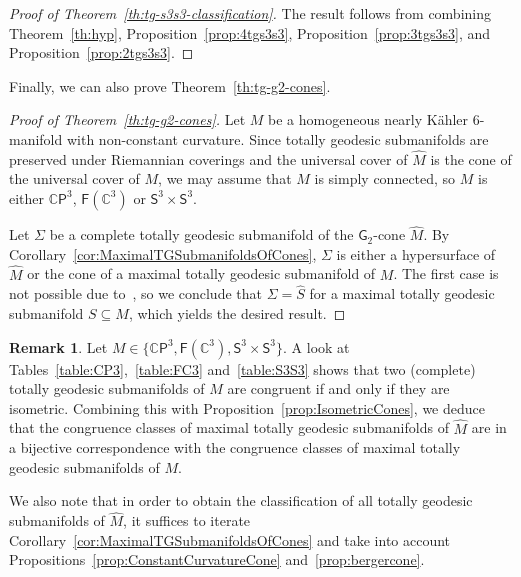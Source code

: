 \documentclass[11pt,a4paper,final]{amsart}
\newcommand{\s}{\mathsf}
\newcommand{\C}{\mathbb{C}}
\renewcommand{\hat}{\widehat}
\theoremstyle{definition}
\newtheorem{remark}[theorem]{Remark}
\begin{document}
\begin{proof}[Proof of Theorem~\ref{th:tg-s3s3-classification}]
	The result follows from combining Theorem~\ref{th:hyp}, Proposition~\ref{prop:4tgs3s3}, Proposition~\ref{prop:3tgs3s3}, and Proposition~\ref{prop:2tgs3s3}. 
\end{proof}

Finally, we can also prove Theorem~\ref{th:tg-g2-cones}.
\begin{proof}[Proof of Theorem~\ref{th:tg-g2-cones}]
	Let $M$ be a homogeneous nearly Kähler $6$-manifold with non-constant curvature.
	Since totally geodesic submanifolds are preserved under Riemannian coverings and the universal cover of $\hat{M}$ is the cone of the universal cover of $M$, we may assume that $M$ is simply connected, so $M$ is either $\C\s{P}^3$, $\s{F}(\C^3)$ or $\s{S}^3\times\s{S}^3$.
	
	Let $\Sigma$ be a complete totally geodesic submanifold of the $\s{G}_2$-cone $\hat{M}$.
	By Corollary~\ref{cor:MaximalTGSubmanifoldsOfCones}, $\Sigma$ is either a hypersurface of $\hat{M}$ or the cone of a maximal totally geodesic submanifold of $M$.
	The first case is not possible due to~\cite[Theorem~1.2]{JentschMoroianuSemmelmann}, so we conclude that $\Sigma=\hat{S}$ for a maximal totally geodesic submanifold $S\subseteq M$, which yields the desired result.
\end{proof}
\begin{remark}
	Let $M\in\{\C\s{P}^3,\s{F}(\C^3),\s{S}^3\times\s{S}^3 \}$.
	A look at Tables~\ref{table:CP3},~\ref{table:FC3} and~\ref{table:S3S3} shows that two (complete) totally geodesic submanifolds of $M$ are congruent if and only if they are isometric.
	Combining this with Proposition~\ref{prop:IsometricCones}, we deduce that the congruence classes of maximal totally geodesic submanifolds of $\hat{M}$ are in a bijective correspondence with the congruence classes of maximal totally geodesic submanifolds of $M$.

	We also note that in order to obtain the classification of all totally geodesic submanifolds of $\hat{M}$, it suffices to iterate Corollary~\ref{cor:MaximalTGSubmanifoldsOfCones} and take into account Propositions~\ref{prop:ConstantCurvatureCone} and~\ref{prop:bergercone}.
\end{remark}
\end{document}
